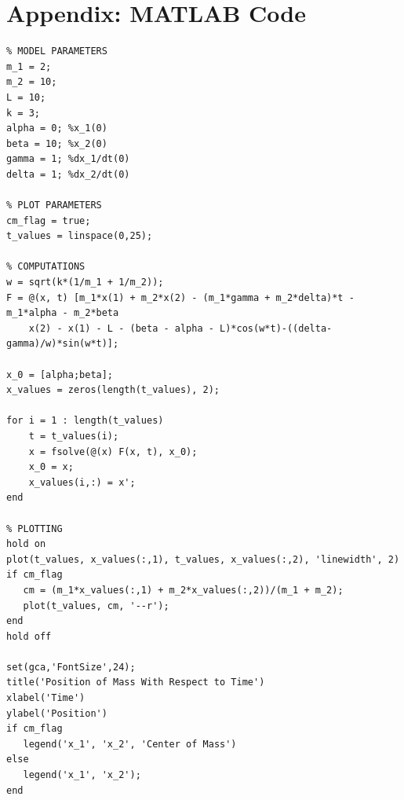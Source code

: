 \documentclass[11pt, oneside]{article}   	%
\begin{document}
\section{Appendix: MATLAB Code}
\vspace{-0.2in}
\begin{lstlisting}
% MODEL PARAMETERS
m_1 = 2;
m_2 = 10;
L = 10;
k = 3;
alpha = 0; %x_1(0)
beta = 10; %x_2(0)
gamma = 1; %dx_1/dt(0)
delta = 1; %dx_2/dt(0)

% PLOT PARAMETERS
cm_flag = true;
t_values = linspace(0,25);

% COMPUTATIONS
w = sqrt(k*(1/m_1 + 1/m_2));
F = @(x, t) [m_1*x(1) + m_2*x(2) - (m_1*gamma + m_2*delta)*t - m_1*alpha - m_2*beta
    x(2) - x(1) - L - (beta - alpha - L)*cos(w*t)-((delta-gamma)/w)*sin(w*t)];

x_0 = [alpha;beta];
x_values = zeros(length(t_values), 2);

for i = 1 : length(t_values)
    t = t_values(i);
    x = fsolve(@(x) F(x, t), x_0);
    x_0 = x;
    x_values(i,:) = x';
end

% PLOTTING
hold on
plot(t_values, x_values(:,1), t_values, x_values(:,2), 'linewidth', 2)
if cm_flag
   cm = (m_1*x_values(:,1) + m_2*x_values(:,2))/(m_1 + m_2);
   plot(t_values, cm, '--r');
end
hold off

set(gca,'FontSize',24);
title('Position of Mass With Respect to Time')
xlabel('Time')
ylabel('Position')
if cm_flag
   legend('x_1', 'x_2', 'Center of Mass') 
else
   legend('x_1', 'x_2');
end
\end{lstlisting}
\end{document}
